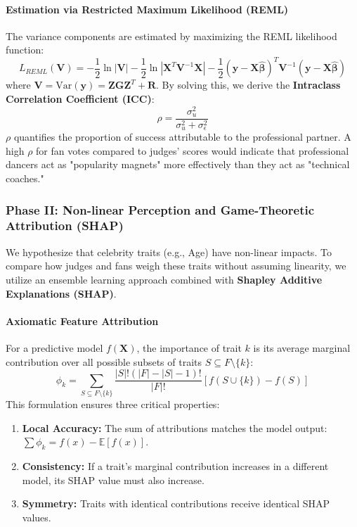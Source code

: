 \documentclass[12pt]{article}
\begin{document}
\paragraph{Estimation via Restricted Maximum Likelihood (REML)}
The variance components are estimated by maximizing the REML likelihood function:
\begin{equation}
    L_{REML}(\mathbf{V}) = -\frac{1}{2} \ln |\mathbf{V}| - \frac{1}{2} \ln |\mathbf{X}^T \mathbf{V}^{-1} \mathbf{X}| - \frac{1}{2} (\mathbf{y} - \mathbf{X}\hat{\bm{\beta}})^T \mathbf{V}^{-1} (\mathbf{y} - \mathbf{X}\hat{\bm{\beta}})
\end{equation}
where $\mathbf{V} = \text{Var}(\mathbf{y}) = \mathbf{Z}\mathbf{G}\mathbf{Z}^T + \mathbf{R}$. By solving this, we derive the \textbf{Intraclass Correlation Coefficient (ICC)}:
\begin{equation}
    \rho = \frac{\sigma_u^2}{\sigma_u^2 + \sigma_\epsilon^2}
\end{equation}
$\rho$ quantifies the proportion of success attributable to the professional partner. A high $\rho$ for fan votes compared to judges' scores would indicate that professional dancers act as "popularity magnets" more effectively than they act as "technical coaches."

\subsubsection{Phase II: Non-linear Perception and Game-Theoretic Attribution (SHAP)}

We hypothesize that celebrity traits (e.g., Age) have non-linear impacts. To compare how judges and fans weigh these traits without assuming linearity, we utilize an ensemble learning approach combined with \textbf{Shapley Additive Explanations (SHAP)}.

\paragraph{Axiomatic Feature Attribution}
For a predictive model $f(\mathbf{X})$, the importance of trait $k$ is its average marginal contribution over all possible subsets of traits $S \subseteq F \setminus \{k\}$:
\begin{equation}
    \phi_k = \sum_{S \subseteq F \setminus \{k\}} \frac{|S|!(|F| - |S| - 1)!}{|F|!} [f(S \cup \{k\}) - f(S)]
\end{equation}
This formulation ensures three critical properties:
\begin{enumerate}
    \item \textbf{Local Accuracy:} The sum of attributions matches the model output: $\sum \phi_k = f(x) - \mathbb{E}[f(x)]$.
    \item \textbf{Consistency:} If a trait's marginal contribution increases in a different model, its SHAP value must also increase.
    \item \textbf{Symmetry:} Traits with identical contributions receive identical SHAP values.
\end{enumerate}
\end{document}
